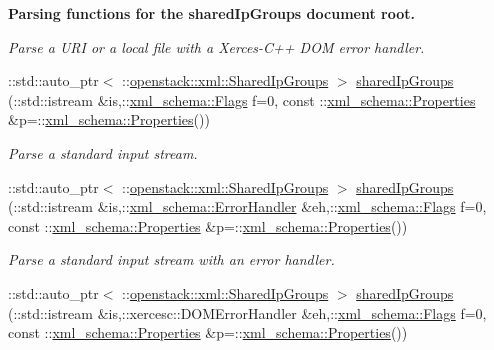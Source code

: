 \begin{Indent}{\bf Parsing functions for the sharedIpGroups document root.}
\begin{DoxyCompactItemize}
\begin{DoxyCompactList}\small\item\em Parse a URI or a local file with a Xerces-\/C++ DOM error handler. \item\end{DoxyCompactList}\item 
::std::auto\_\-ptr$<$ ::\hyperlink{classopenstack_1_1xml_1_1SharedIpGroups}{openstack::xml::SharedIpGroups} $>$ \hyperlink{namespaceopenstack_1_1xml_a664e5c0fd17a8f69d551732c155be801}{sharedIpGroups} (::std::istream \&is,::\hyperlink{namespacexml__schema_affb4c227cbd9aa7453dd1dc5a1401943}{xml\_\-schema::Flags} f=0, const ::\hyperlink{namespacexml__schema_ad27ce19a7ee1d3b1064092648898f64c}{xml\_\-schema::Properties} \&p=::\hyperlink{namespacexml__schema_ad27ce19a7ee1d3b1064092648898f64c}{xml\_\-schema::Properties}())
\begin{DoxyCompactList}\small\item\em Parse a standard input stream. \item\end{DoxyCompactList}\item 
::std::auto\_\-ptr$<$ ::\hyperlink{classopenstack_1_1xml_1_1SharedIpGroups}{openstack::xml::SharedIpGroups} $>$ \hyperlink{namespaceopenstack_1_1xml_a7ae551fce0d0e307c4ccc477be5f9231}{sharedIpGroups} (::std::istream \&is,::\hyperlink{namespacexml__schema_ab1c9361bfd3b404eaabf0c31eded79dc}{xml\_\-schema::ErrorHandler} \&eh,::\hyperlink{namespacexml__schema_affb4c227cbd9aa7453dd1dc5a1401943}{xml\_\-schema::Flags} f=0, const ::\hyperlink{namespacexml__schema_ad27ce19a7ee1d3b1064092648898f64c}{xml\_\-schema::Properties} \&p=::\hyperlink{namespacexml__schema_ad27ce19a7ee1d3b1064092648898f64c}{xml\_\-schema::Properties}())
\begin{DoxyCompactList}\small\item\em Parse a standard input stream with an error handler. \item\end{DoxyCompactList}\item 
::std::auto\_\-ptr$<$ ::\hyperlink{classopenstack_1_1xml_1_1SharedIpGroups}{openstack::xml::SharedIpGroups} $>$ \hyperlink{namespaceopenstack_1_1xml_ae07217f12371905e90ae4822b7953c1e}{sharedIpGroups} (::std::istream \&is,::xercesc::DOMErrorHandler \&eh,::\hyperlink{namespacexml__schema_affb4c227cbd9aa7453dd1dc5a1401943}{xml\_\-schema::Flags} f=0, const ::\hyperlink{namespacexml__schema_ad27ce19a7ee1d3b1064092648898f64c}{xml\_\-schema::Properties} \&p=::\hyperlink{namespacexml__schema_ad27ce19a7ee1d3b1064092648898f64c}{xml\_\-schema::Properties}())

\end{DoxyCompactItemize}
\end{Indent}
